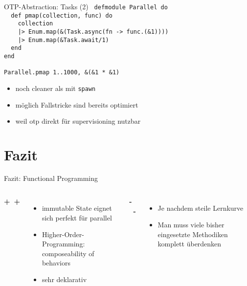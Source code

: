 \documentclass[compress]{beamer}
\begin{document}
  \begin{frame}{OTP-Abstraction: Tasks (2)}
    \texttt{
    defmodule Parallel do\\
    ~~def pmap(collection, func) do\\
    ~~~~collection \\
    ~~~~|> Enum.map(\&(Task.async(fn -> func.(\&1))))\\
    ~~~~|> Enum.map(\&Task.await/1) \\
    ~~end\\
    end\\
    ~\\
    Parallel.pmap 1..1000, \&(\&1 * \&1)\\
  }
    \begin{itemize}
      \item<2-2> noch cleaner als mit \texttt{spawn}
      \item<2-2> möglich Fallstricke sind bereits optimiert
      \item<2-2> weil otp direkt für supervisioning nutzbar
    \end{itemize}
  \end{frame}

\section{Fazit}
  \begin{frame}{Fazit: Functional Programming}
    \begin{columns}[c]
      \textbf{+~+}
      \begin{itemize}
        \item immutable State eignet sich perfekt für parallel
        \item Higher-Order-Programming: composeability of behaviors
        \item sehr deklarativ 
      \end{itemize}
      \textbf{-~-}
      \begin{itemize}
        \item Je nachdem steile Lernkurve
        \item Man muss viele bisher eingesetzte Methodiken komplett überdenken
      \end{itemize}
    \end{columns}
  \end{frame}
  
\end{document}
